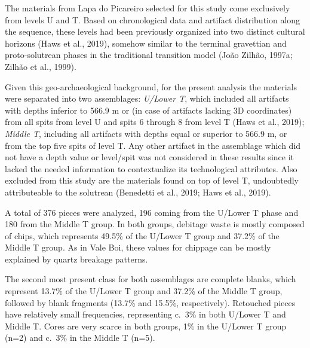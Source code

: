 \documentclass[12pt,twoside]{reedthesis}
\begin{document}
The materials from Lapa do Picareiro selected for this study come exclusively from levels U and T. Based on chronological data and artifact distribution along the sequence, these levels had been previously organized into two distinct cultural horizons (Haws et al., 2019), somehow similar to the terminal gravettian and proto-solutrean phases in the traditional transition model (João Zilhão, 1997a; Zilhão et al., 1999).

Given this geo-archaeological background, for the present analysis the materials were separated into two assemblages: \emph{U/Lower T}, which included all artifacts with depths inferior to 566.9 m or (in case of artifacts lacking 3D coordinates) from all spits from level U and spits 6 through 8 from level T (Haws et al., 2019); \emph{Middle T}, including all artifacts with depths equal or superior to 566.9 m, or from the top five spits of level T. Any other artifact in the assemblage which did not have a depth value or level/spit was not considered in these results since it lacked the needed information to contextualize its technological attributes. Also excluded from this study are the materials found on top of level T, undoubtedly attributeable to the solutrean (Benedetti et al., 2019; Haws et al., 2019).

A total of 376 pieces were analyzed, 196 coming from the U/Lower T phase and 180 from the Middle T group. In both groups, debitage waste is mostly composed of chips, which represents 49.5\% of the U/Lower T group and 37.2\% of the Middle T group. As in Vale Boi, these values for chippage can be mostly explained by quartz breakage patterns.

The second most present class for both assemblages are complete blanks, which represent 13.7\% of the U/Lower T group and 37.2\% of the Middle T group, followed by blank fragments (13.7\% and 15.5\%, respectively). Retouched pieces have relatively small frequencies, representing c.~3\% in both U/Lower T and Middle T. Cores are very scarce in both groups, 1\% in the U/Lower T group (n=2) and c.~3\% in the Middle T (n=5).

~
\end{document}
